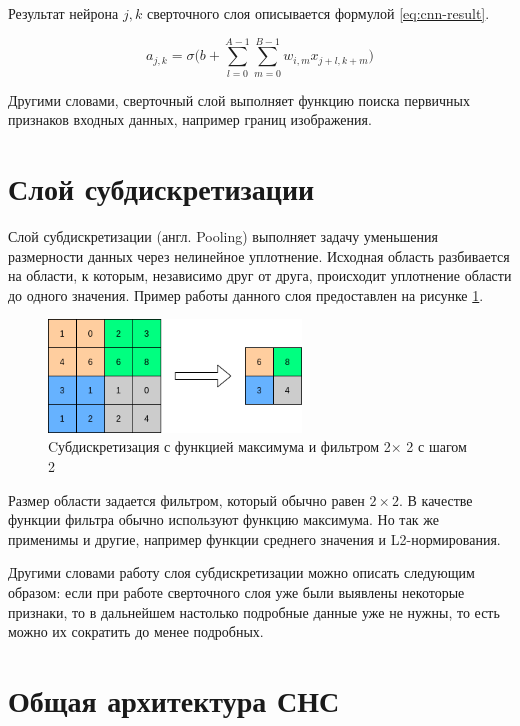 Результат нейрона $j,k$ сверточного слоя описывается формулой \ref{eq:cnn-result}.

\begin{equation}\label{eq:cnn-result}
a_{j,k} = \sigma \Bigg(b + \sum_{l=0}^{A-1} \sum_{m=0}^{B-1} w_{i,m}x_{j+l,k+m}\Bigg)
\end{equation}

Другими словами, сверточный слой выполняет функцию поиска первичных признаков входных данных, например границ изображения.

\section*{Слой субдискретизации}

Слой субдискретизации (англ. Pooling) выполняет задачу уменьшения размерности данных через нелинейное уплотнение. Исходная область разбивается на области, к которым, независимо друг от друга, происходит уплотнение области до одного значения. Пример работы данного слоя предоставлен на рисунке \ref{anal:CNN-pooling}.

\begin{figure}
	\centering
	\includegraphics[width=0.6\textwidth]{inc/img/pooling}
	\caption{Cубдискретизация с функцией максимума и фильтром 2$\times$ 2 с шагом 2}
	\label{anal:CNN-pooling}
\end{figure}

Размер области задается фильтром, который обычно равен $2 \times 2$. В качестве функции фильтра обычно используют функцию максимума. Но так же применимы и другие, например функции среднего значения и L2-нормирования. 

Другими словами работу слоя субдискретизации можно описать следующим образом: если при работе сверточного слоя уже были выявлены некоторые признаки, то в дальнейшем настолько подробные данные уже не нужны, то есть можно их сократить до менее подробных.

\section*{Общая архитектура СНС}

